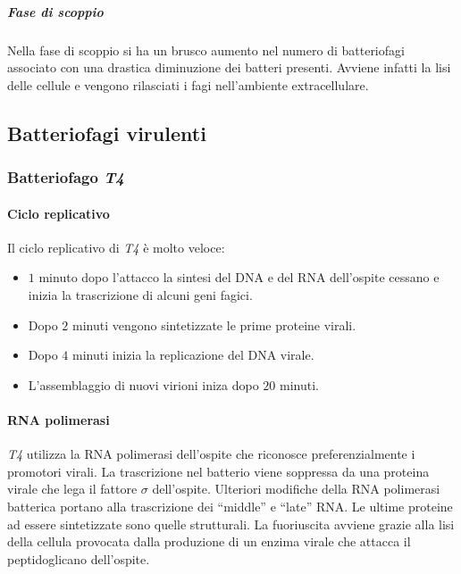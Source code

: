 				\subparagraph{Fase di scoppio}
				Nella fase di scoppio si ha un brusco aumento nel numero di batteriofagi associato con una drastica diminuzione dei batteri presenti.
				Avviene infatti la lisi delle cellule e vengono rilasciati i fagi nell'ambiente extracellulare.

	\subsection{Batteriofagi virulenti}

		\subsubsection{Batteriofago \emph{T4}}

			\paragraph{Ciclo replicativo}
			Il ciclo replicativo di \emph{T4} \`e molto veloce:
			\begin{multicols}{2}
				\begin{itemize}
    					\item $1$ minuto dopo l'attacco la sintesi del DNA e del RNA dell'ospite cessano e inizia la trascrizione di alcuni geni fagici.
    					\item Dopo $2$ minuti vengono sintetizzate le prime proteine virali.
    					\item Dopo $4$ minuti inizia la replicazione del DNA virale.
    					\item L'assemblaggio di nuovi virioni iniza dopo $20$ minuti. 
				\end{itemize}
			\end{multicols}

			\paragraph{RNA polimerasi}
			\emph{T4} utilizza la RNA polimerasi dell'ospite che riconosce preferenzialmente i promotori virali. 
			La trascrizione nel batterio viene soppressa da una proteina virale che lega il fattore $\sigma$ dell'ospite. 
			Ulteriori modifiche della RNA polimerasi batterica portano alla trascrizione dei ``middle'' e ``late'' RNA. 
			Le ultime proteine ad essere sintetizzate sono quelle strutturali. 
			La fuoriuscita avviene grazie alla lisi della cellula provocata dalla produzione di un enzima virale che attacca il peptidoglicano dell'ospite. 

